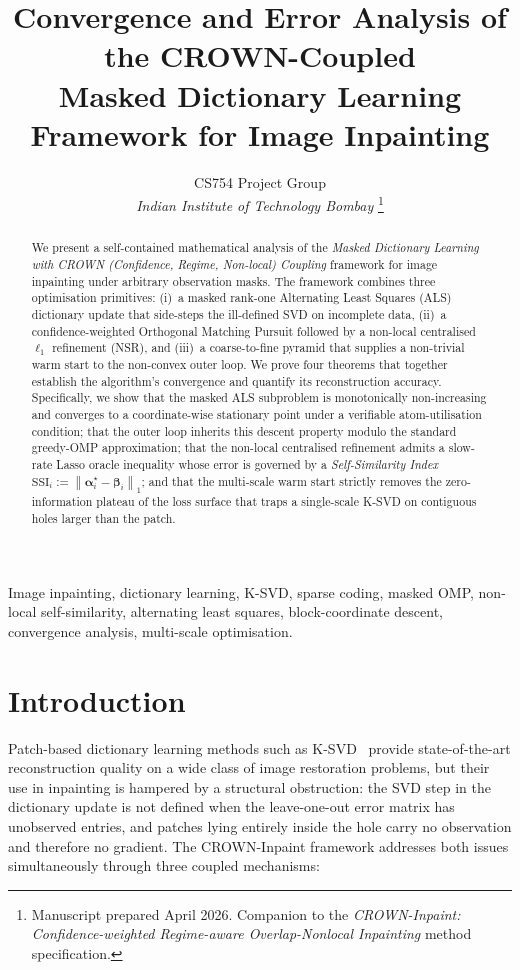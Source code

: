 \documentclass[journal,onecolumn,11pt]{IEEEtran}
\title{Convergence and Error Analysis of the CROWN-Coupled \\
       Masked Dictionary Learning Framework for Image Inpainting}
\author{%
  CS754 Project Group\\
  \textit{Indian Institute of Technology Bombay}%
  \thanks{Manuscript prepared April 2026. Companion to the
  \emph{CROWN-Inpaint: Confidence-weighted Regime-aware Overlap-Nonlocal Inpainting}
  method specification.}}
\theoremstyle{definition}
\newcommand{\norm}[1]{\left\lVert #1 \right\rVert}
\begin{document}
\maketitle

\begin{abstract}
We present a self-contained mathematical analysis of the
\emph{Masked Dictionary Learning with CROWN (Confidence, Regime, Non-local)
Coupling} framework for image inpainting under arbitrary observation masks.
The framework combines three optimisation primitives: (i)~a masked rank-one
Alternating Least Squares (ALS) dictionary update that side-steps the
ill-defined SVD on incomplete data, (ii)~a confidence-weighted Orthogonal
Matching Pursuit followed by a non-local centralised $\ell_1$ refinement
(NSR), and (iii)~a coarse-to-fine pyramid that supplies a non-trivial warm
start to the non-convex outer loop. We prove four theorems that together
establish the algorithm's convergence and quantify its reconstruction
accuracy. Specifically, we show that the masked ALS subproblem is
monotonically non-increasing and converges to a coordinate-wise stationary
point under a verifiable atom-utilisation condition; that the outer loop
inherits this descent property modulo the standard greedy-OMP approximation;
that the non-local centralised refinement admits a slow-rate Lasso oracle
inequality whose error is governed by a \emph{Self-Similarity Index}
$\mathrm{SSI}_i := \norm{\bm{\alpha}_i^\star - \bm{\beta}_i}_1$; and that the
multi-scale warm start strictly removes the zero-information plateau of the
loss surface that traps a single-scale K-SVD on contiguous holes larger than
the patch.
\end{abstract}

\begin{IEEEkeywords}
Image inpainting, dictionary learning, K-SVD, sparse coding, masked OMP,
non-local self-similarity, alternating least squares, block-coordinate
descent, convergence analysis, multi-scale optimisation.
\end{IEEEkeywords}

\section{Introduction}
Patch-based dictionary learning methods such as K-SVD~\cite{aharon2006ksvd}
provide state-of-the-art reconstruction quality on a wide class of image
restoration problems, but their use in inpainting is hampered by a
structural obstruction: the SVD step in the dictionary update is not
defined when the leave-one-out error matrix has unobserved entries, and
patches lying entirely inside the hole carry no observation and therefore
no gradient. The CROWN-Inpaint framework addresses both issues
simultaneously through three coupled mechanisms:
\end{document}
